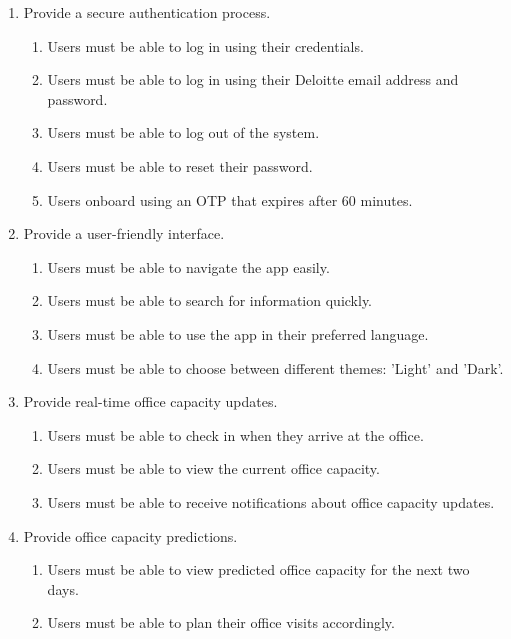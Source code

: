 \documentclass[11pt,a4paper]{article}
\begin{document}
\begin{enumerate}[label=\arabic*.]
    \item Provide a secure authentication process.
    \begin{enumerate}
        \item Users must be able to log in using their credentials.
        \item Users must be able to log in using their Deloitte email address and password.
        \item Users must be able to log out of the system.
        \item Users must be able to reset their password.
        \item Users onboard using an OTP that expires after 60 minutes.
    \end{enumerate}
    
    \item Provide a user-friendly interface.
    \begin{enumerate}
        \item Users must be able to navigate the app easily.
        \item Users must be able to search for information quickly.
        \item Users must be able to use the app in their preferred language.
        \item Users must be able to choose between different themes: 'Light' and 'Dark'.
    \end{enumerate}
    
    \item Provide real-time office capacity updates.
    \begin{enumerate}
        \item Users must be able to check in when they arrive at the office.
        \item Users must be able to view the current office capacity.
        \item Users must be able to receive notifications about office capacity updates.
    \end{enumerate}
    
    \item Provide office capacity predictions.
    \begin{enumerate}
        \item Users must be able to view predicted office capacity for the next two days.
        \item Users must be able to plan their office visits accordingly.
    \end{enumerate}
    

\end{enumerate}
\end{document}
